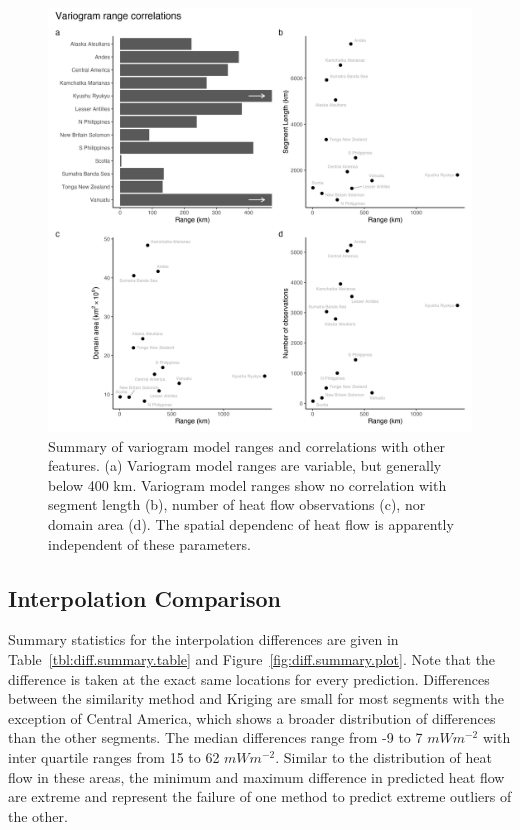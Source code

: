 \documentclass[draft,linenumbers]{agujournal2018}
\begin{document}
\begin{figure}[h]

{\centering \includegraphics[width=0.95\linewidth,]{../figs/summary/variogram_summary} 

}

\caption{Summary of variogram model ranges and correlations with other features. (a) Variogram model ranges are variable, but generally below 400 km. Variogram model ranges show no correlation with segment length (b), number of heat flow observations (c), nor domain area (d). The spatial dependenc of heat flow is apparently independent of these parameters.}\label{fig:variogram.summary.plot}
\end{figure}

\subsection{Interpolation Comparison}

Summary statistics for the interpolation differences are given in
Table~\ref{tbl:diff.summary.table} and
Figure~\ref{fig:diff.summary.plot}. Note that the difference is taken at
the exact same locations for every prediction. Differences between the
similarity method and Kriging are small for most segments with the
exception of Central America, which shows a broader distribution of
differences than the other segments. The median differences range from
-9 to 7 \(mWm^{-2}\) with inter quartile ranges from 15 to 62
\(mWm^{-2}\). Similar to the distribution of heat flow in these areas,
the minimum and maximum difference in predicted heat flow are extreme
and represent the failure of one method to predict extreme outliers of
the other.
\end{document}
